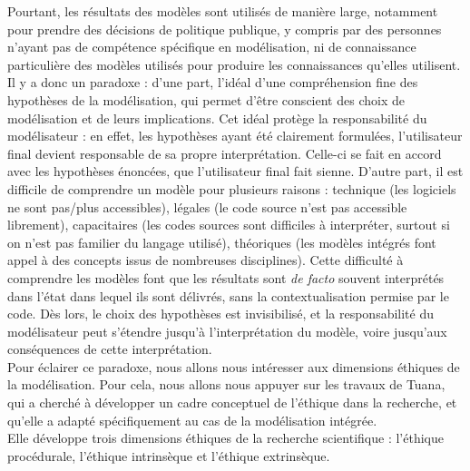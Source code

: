 Pourtant, les résultats des modèles sont utilisés de manière large, notamment pour prendre des décisions de politique publique, y compris par des personnes n'ayant pas de compétence spécifique en modélisation, ni de connaissance particulière des modèles utilisés pour produire les connaissances qu'elles utilisent. Il y a donc un paradoxe : d'une part, l'idéal d'une compréhension fine des hypothèses de la modélisation, qui permet d'être conscient des choix de modélisation et de leurs implications. Cet idéal protège la responsabilité du modélisateur : en effet, les hypothèses ayant été clairement formulées, l'utilisateur final devient responsable de sa propre interprétation. Celle-ci se fait en accord avec les hypothèses énoncées, que l'utilisateur final fait sienne. D'autre part, il est difficile de comprendre un modèle pour plusieurs raisons : technique (les logiciels ne sont pas/plus accessibles), légales (le code source n'est pas accessible librement), capacitaires (les codes sources sont difficiles à interpréter, surtout si on n'est pas familier du langage utilisé), théoriques (les modèles intégrés font appel à des concepts issus de nombreuses disciplines). Cette difficulté à comprendre les modèles font que les résultats sont \textit{de facto} souvent interprétés dans l'état dans lequel ils sont délivrés, sans la contextualisation permise par le code. Dès lors, le choix des hypothèses est invisibilisé, et la responsabilité du modélisateur peut s'étendre jusqu'à l'interprétation du modèle, voire jusqu'aux conséquences de cette interprétation. \\

Pour éclairer ce paradoxe, nous allons nous intéresser aux dimensions éthiques de la modélisation. Pour cela, nous allons nous appuyer sur les travaux de Tuana, qui a cherché à développer un cadre conceptuel de l'éthique dans la recherche, et qu'elle a adapté spécifiquement au cas de la modélisation intégrée. \\

Elle développe trois dimensions éthiques de la recherche scientifique : l'éthique procédurale, l'éthique intrinsèque et l'éthique extrinsèque. 

